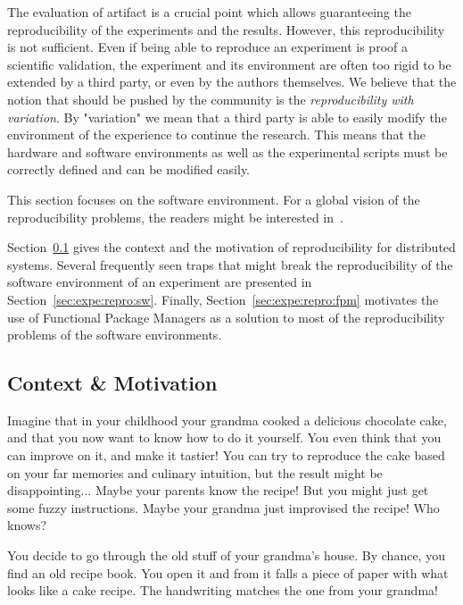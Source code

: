 \documentclass[sigconf,natbib=false]{acmart}
\begin{document}
The evaluation of artifact is a crucial point which allows guaranteeing the reproducibility of the experiments and the results.
However, this reproducibility is not sufficient.
Even if being able to reproduce an experiment is proof a scientific validation, the experiment and its environment are often too rigid to be extended by a third party, or even by the authors themselves. 
We believe that the notion that should be pushed by the community is the \emph{reproducibility with variation}.
By "variation" we mean that a third party is able to easily modify the environment of the experience to continue the research.
This means that the hardware and software environments as well as the experimental scripts must be correctly defined and can be modified easily.

This section focuses on the software environment.
For a global vision of the reproducibility problems, the readers might be interested in\ \cite{ivie2018reproducibility}.



Section\ \ref{sec:expe:repro:motiv} gives the context and the motivation of reproducibility for distributed systems.
Several frequently seen traps that might break the reproducibility of the software environment of an experiment are presented in Section\ \ref{sec:expe:repro:sw}.
Finally, Section\ \ref{sec:expe:repro:fpm} motivates the use of Functional Package Managers as a solution to most of the reproducibility problems of the software environments. 

\subsection{Context \& Motivation}\label{sec:expe:repro:motiv}

Imagine that in your childhood your grandma cooked a delicious chocolate cake, and that you now want to know how to do it yourself.
You even think that you can improve on it, and make it tastier!
You can try to reproduce the cake based on your far memories and culinary intuition, but the result might be disappointing...
Maybe your parents know the recipe!
But you might just get some fuzzy instructions.
Maybe your grandma just improvised the recipe!
Who knows?

You decide to go through the old stuff of your grandma's house.
By chance, you find an old recipe book.
You open it and from it falls a piece of paper with what looks like a cake recipe.
The handwriting matches the one from your grandma!
\end{document}
